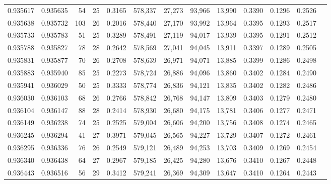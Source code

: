 \begin{tabular}{rrrrrrrrrrrrr}
0.935617 & 0.935635 &    54 &  25 &                                     0.3165 & 578,337 &  27,273 &  93,966 &  13,990 & 0.3390 & 0.1296 & 0.2526 \\
0.935638 & 0.935732 &   103 &  26 &                                     0.2016 & 578,440 &  27,170 &  93,992 &  13,964 & 0.3395 & 0.1293 & 0.2517 \\
0.935733 & 0.935783 &    51 &  25 &                                     0.3289 & 578,491 &  27,119 &  94,017 &  13,939 & 0.3395 & 0.1291 & 0.2512 \\
0.935788 & 0.935827 &    78 &  28 &                                     0.2642 & 578,569 &  27,041 &  94,045 &  13,911 & 0.3397 & 0.1289 & 0.2505 \\
0.935831 & 0.935877 &    70 &  26 &                                     0.2708 & 578,639 &  26,971 &  94,071 &  13,885 & 0.3399 & 0.1286 & 0.2498 \\
0.935883 & 0.935940 &    85 &  25 &                                     0.2273 & 578,724 &  26,886 &  94,096 &  13,860 & 0.3402 & 0.1284 & 0.2490 \\
0.935941 & 0.936029 &    50 &  25 &                                     0.3333 & 578,774 &  26,836 &  94,121 &  13,835 & 0.3402 & 0.1282 & 0.2486 \\
0.936030 & 0.936103 &    68 &  26 &                                     0.2766 & 578,842 &  26,768 &  94,147 &  13,809 & 0.3403 & 0.1279 & 0.2480 \\
0.936104 & 0.936147 &    88 &  28 &                                     0.2414 & 578,930 &  26,680 &  94,175 &  13,781 & 0.3406 & 0.1277 & 0.2471 \\
0.936149 & 0.936238 &    74 &  25 &                                     0.2525 & 579,004 &  26,606 &  94,200 &  13,756 & 0.3408 & 0.1274 & 0.2465 \\
0.936245 & 0.936294 &    41 &  27 &                                     0.3971 & 579,045 &  26,565 &  94,227 &  13,729 & 0.3407 & 0.1272 & 0.2461 \\
0.936295 & 0.936336 &    76 &  26 &                                     0.2549 & 579,121 &  26,489 &  94,253 &  13,703 & 0.3409 & 0.1269 & 0.2454 \\
0.936340 & 0.936438 &    64 &  27 &                                     0.2967 & 579,185 &  26,425 &  94,280 &  13,676 & 0.3410 & 0.1267 & 0.2448 \\
0.936443 & 0.936516 &    56 &  29 &                                     0.3412 & 579,241 &  26,369 &  94,309 &  13,647 & 0.3410 & 0.1264 & 0.2443 \\

\end{tabular}
